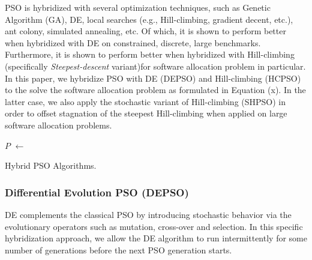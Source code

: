 PSO is hybridized with several optimization techniques, such as Genetic Algorithm (GA), DE, local searches (e.g., Hill-climbing, gradient decent, etc.), ant colony, simulated annealing, etc. Of which, it is shown to perform better when hybridized with DE on constrained, discrete, large benchmarks. Furthermore, it is shown to perform better when hybridized with Hill-climbing (specifically \textit{Steepest-descent} variant)for software allocation problem \cite{} in particular. In this paper, we hybridize PSO with DE (DEPSO) and Hill-climbing (HCPSO) to the solve the software allocation problem as formulated in Equation (x). In the latter case, we also apply the stochastic variant of Hill-climbing (SHPSO) in order to offset stagnation of the steepest Hill-climbing when applied on large software allocation problems.

\IncMargin{1em}
\begin{algorithm}[H]

\BlankLine
{}
\BlankLine
\Particles $P$ $\leftarrow$ \InitPSO{}\;
\BlankLine
 \caption{Hybrid PSO Algorithms.}\label{alg_depso}
\end{algorithm}\DecMargin{1em}
 
\subsubsection{Differential Evolution PSO (DEPSO)}
DE complements the classical PSO by introducing stochastic behavior via the evolutionary operators such as mutation, cross-over and selection. In this specific hybridization approach, we allow the DE algorithm to run intermittently for some number of generations before the next PSO generation starts.

